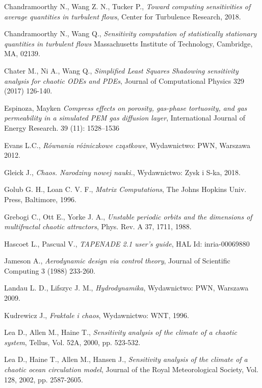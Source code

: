 \documentclass[12pt, twoside]{book}
\begin{document}
\begin{thebibliography}{99}
 Chandramoorthy N., Wang Z. N., Tucker P.,
\emph{Toward computing sensitivities of average
quantities in turbulent flows},
Center for Turbulence Research, 2018.

 Chandramoorthy N., Wang Q.,
\emph{Sensitivity computation of statistically stationary quantities in turbulent flows}
Massachusetts Institute of Technology, Cambridge, MA, 02139.

 Chater M., Ni A., Wang Q., 
\emph{Simplified Least Squares Shadowing sensitivity analysis for chaotic ODEs and PDEs},
Journal of Computational Physics 329 (2017) 126-140.

 Espinoza, Mayken 
\emph{Compress effects on porosity, gas-phase tortuosity, and gas permeability in a simulated PEM gas diffusion layer},
International Journal of Energy Research. 39 (11): 1528–1536

 Evans L.C.,
\emph{Równania różniczkowe cząstkowe},
Wydawnictwo: PWN, Warszawa 2012.

 Gleick J.,
\emph{Chaos. Narodziny nowej nauki.},
Wydawnictwo: Zysk i S-ka, 2018.

 Golub G. H., Loan C. V. F.,
\emph{Matrix Computations},
The Johns Hopkins Univ. Press, Baltimore, 1996.

 Grebogi C., Ott E., Yorke J. A.,   
\emph{Unstable periodic orbits and the dimensions of multifractal chaotic attractors},
Phys. Rev. A 37, 1711, 1988.

 Hascoet L., Pascual V.,
\emph{TAPENADE 2.1 user’s guide},
HAL Id: inria-00069880

 Jameson A.,
\emph{Aerodynamic design via control theory},
Journal of Scientific Computing 3 (1988) 233-260.

 Landau L. D., Lifszyc J. M.,
\emph{Hydrodynamika},
Wydawnictwo: PWN, Warszawa 2009.

 Kudrewicz J., 
\emph{Fraktale i chaos},
Wydawnictwo: WNT, 1996.

 Lea D., Allen M., Haine T.,
\emph{Sensitivity analysis of the climate of a chaotic system},
Tellus, Vol. 52A, 2000, pp. 523-532.

 Lea D., Haine T., Allen M., Hansen J., 
\emph{Sensitivity analysis of the climate of a chaotic ocean circulation model},
Journal of the Royal Meteorological Society, Vol. 128, 2002, pp. 2587-2605.


\end{thebibliography}
\end{document}
